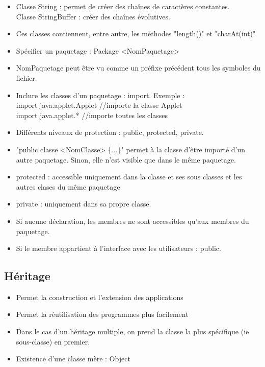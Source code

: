 \bigskip
\begin{itemize}
	\item Classe String : permet de créer des chaînes de caractères constantes. \\
		Classe StringBuffer : créer des chaînes évolutives.
	\item Ces classes contiennent, entre autre, les méthodes "length()" et "charAt(int)"
\end{itemize}

\bigskip
\begin{itemize}
	\item Spécifier un paquetage : Package <NomPaquetage>
	\item NomPaquetage peut être vu comme un préfixe précédent tous les symboles du fichier.
	\item Inclure les classes d'un paquetage : import. Exemple : \\
		import java.applet.Applet //importe la classe Applet \\
		import java.applet.* //importe toutes les classes
\end{itemize}

\bigskip
\begin{itemize}
	\item Différents niveaux de protection : public, protected, private.
	\item "public classe <NomClasse> \{...\}" permet à la classe d'être importé d'un autre paquetage. Sinon, elle n'est visible que dans le même paquetage.
	\item protected : accessible uniquement dans la classe et ses sous classes et les autres clases du même paquetage
	\item private : uniquement dans sa propre classe.
	\item Si aucune déclaration, les membres ne sont accessibles qu'aux membres du paquetage.
	\item Si le membre appartient à l'interface avec les utilisateurs : public.
\end{itemize}

\subsection{Héritage}
\begin{itemize}
	\item Permet la construction et l'extension des applications
	\item Permet la réutilisation des programmes plus facilement
	\item Dans le cas d'un héritage multiple, on prend la classe la plus spécifique (ie sous-classe) en premier.
	\item Existence d'une classe mère : Object
\end{itemize}

